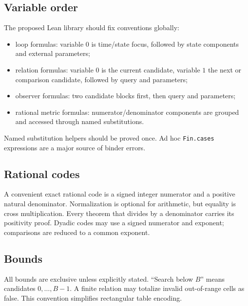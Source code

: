 \subsection{Variable order}

The proposed Lean library should fix conventions globally:
\begin{itemize}
  \item loop formulas: variable \(0\) is time/state focus, followed by state components and external parameters;
  \item relation formulas: variable \(0\) is the current candidate, variable \(1\) the next or comparison candidate, followed by query and parameters;
  \item observer formulas: two candidate blocks first, then query and parameters;
  \item rational metric formulas: numerator/denominator components are grouped and accessed through named substitutions.
\end{itemize}
Named substitution helpers should be proved once.  Ad hoc \texttt{Fin.cases} expressions are a major source of binder errors.

\subsection{Rational codes}

A convenient exact rational code is a signed integer numerator and a positive natural denominator.  Normalization is optional for arithmetic, but equality is cross multiplication.  Every theorem that divides by a denominator carries its positivity proof.  Dyadic codes may use a signed numerator and exponent; comparisons are reduced to a common exponent.

\subsection{Bounds}

All bounds are exclusive unless explicitly stated.  ``Search below \(B\)'' means candidates \(0,\ldots,B-1\).  A finite relation may totalize invalid out-of-range cells as false.  This convention simplifies rectangular table encoding.
